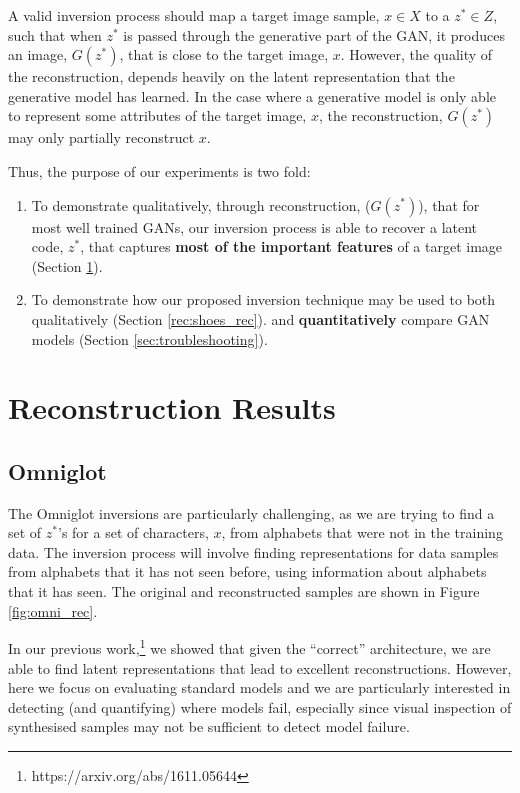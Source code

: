 \documentclass[journal]{IEEEtran}
\begin{document}
A valid inversion process should map a target image sample, $x\in X$ to a $z^* \in Z$, such that when $z^*$ is passed through the generative part of the GAN, it produces an image, $G(z^*)$, that is close to the target image, $x$. However, the quality of the reconstruction, depends heavily on the latent representation that the generative model has learned. In the case where a generative model is only able to represent some attributes of the target image, $x$, the reconstruction, $G(z^*)$ may only partially reconstruct $x$.

Thus, the purpose of our experiments is two fold:
\begin{enumerate}
    \item To demonstrate qualitatively, through reconstruction, ($G(z^*)$), that for most well trained GANs, our inversion process is able to recover a latent code, $z^*$, that captures \textbf{most of the important features} of a target image (Section \ref{sec:results}).
    \item To demonstrate how our proposed inversion technique may be used to both qualitatively (Section \ref{rec:shoes_rec}). and \textbf{quantitatively} compare GAN models (Section \ref{sec:troubleshooting}).
\end{enumerate}








\section{Reconstruction Results}
\label{sec:results}

\subsection{Omniglot}
The Omniglot inversions are particularly challenging, as we are trying to find a set of $z^*$'s for a set of characters, $x$, from alphabets that were not in the training data. The inversion process will involve finding representations for data samples from alphabets that it has not seen before, using information about alphabets that it has seen. The original and reconstructed samples are shown in Figure \ref{fig:omni_rec}.


In our previous work,\footnote{https://arxiv.org/abs/1611.05644} we showed that given the ``correct'' architecture, we are able to find latent representations that lead to excellent reconstructions. However, here we focus on evaluating standard models \cite{radford2015unsupervised} and we are particularly interested in detecting (and quantifying) where models fail, especially since visual inspection of synthesised samples may not be sufficient to detect model failure. 
\end{document}

